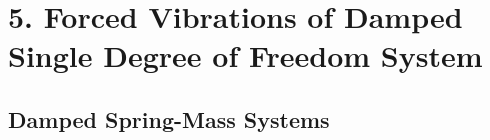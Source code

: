 \section*{5. Forced Vibrations of Damped Single Degree of Freedom System}
\subsection*{Damped Spring-Mass Systems}
